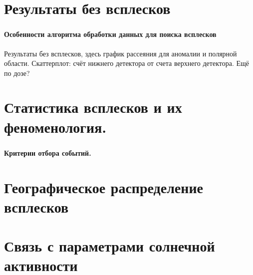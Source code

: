 \documentclass[t, aspectratio=43]{beamer}
\begin{document}
\section{Результаты без всплесков}

\begin{frame}	
\frametitle{\insertsection} 
\framesubtitle{Особенности алгоритма обработки данных для поиска всплесков}
Результаты без всплесков, здесь график рассеяния для аномалии и
полярной области. Скаттерплот: счёт нижнего детектора от счета
верхнего детектора. Ещё по дозе?
\end{frame}

\section{Статистика всплесков и их феноменология. }

\begin{frame}	
\frametitle{\insertsection} 
\framesubtitle{Критерии отбора событий.}

\end{frame}

\section{Географическое распределение всплесков}

\begin{frame}	
\frametitle{\insertsection} 


\end{frame}

\section{Связь с параметрами солнечной активности}
\end{document}
